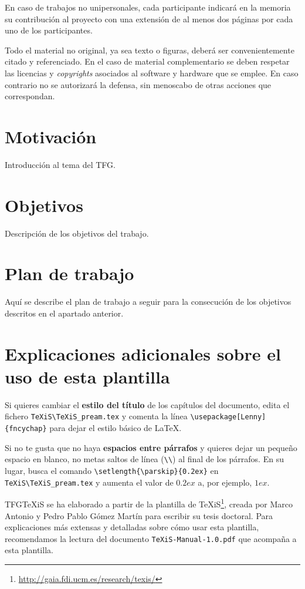 En caso de trabajos no unipersonales, cada participante indicará en la memoria su contribución al proyecto con una extensión de al menos dos páginas por cada uno de los participantes.

Todo el material no original, ya sea texto o figuras, deberá ser convenientemente citado y referenciado. En el caso de material complementario se deben respetar las licencias y \emph{copyrights} asociados al software y hardware que se emplee. En caso contrario no se autorizará la defensa, sin menoscabo de otras acciones que correspondan.


\section{Motivación}
Introducción al tema del TFG.


\section{Objetivos}
Descripción de los objetivos del trabajo.


\section{Plan de trabajo}
Aquí se describe el plan de trabajo a seguir para la consecución de los objetivos descritos en el apartado anterior.



\section{Explicaciones adicionales sobre el uso de esta plantilla}
Si quieres cambiar el \textbf{estilo del título} de los capítulos del documento, edita el fichero \verb|TeXiS\TeXiS_pream.tex| y comenta la línea \verb|\usepackage[Lenny]{fncychap}| para dejar el estilo básico de \LaTeX.

Si no te gusta que no haya \textbf{espacios entre párrafos} y quieres dejar un pequeño espacio en blanco, no metas saltos de línea (\verb|\\|) al final de los párrafos. En su lugar, busca el comando  \verb|\setlength{\parskip}{0.2ex}| en \verb|TeXiS\TeXiS_pream.tex| y aumenta el valor de $0.2ex$ a, por ejemplo, $1ex$.

TFGTeXiS se ha elaborado a partir de la plantilla de TeXiS\footnote{\url{http://gaia.fdi.ucm.es/research/texis/}}, creada por Marco Antonio y Pedro Pablo Gómez Martín para escribir su tesis doctoral. Para explicaciones más extensas y detalladas sobre cómo usar esta plantilla, recomendamos la lectura del documento \texttt{TeXiS-Manual-1.0.pdf} que acompaña a esta plantilla.

